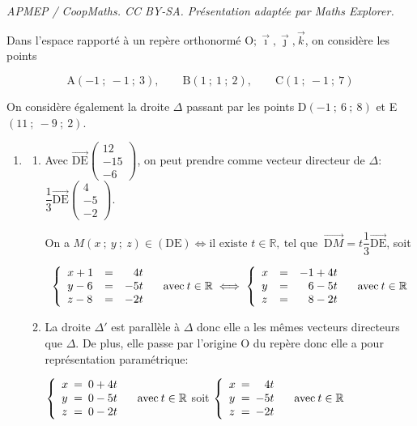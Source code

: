 \documentclass[10pt]{article}
\providecommand{\R}{\mathbb{R}}
\providecommand{\vect}[1]{\overrightarrow{#1}}
\providecommand{\Oijk}{\(\mathrm{O};\vec{\imath},\vec{\jmath},\vec{k}\)}
\begin{document}
\noindent\textit{APMEP / CoopMaths. CC BY-SA. Présentation adaptée par Maths Explorer.}\par\medskip
\medskip

Dans l'espace rapporté à un repère orthonormé \Oijk, on considère les points

\[\text{A}(-1~;~-1~;~3),\qquad \text{B}(1~;~1~;~2),\qquad  \text{C}(1~;~-1~;~7)\]

On considère également la droite $\Delta$ passant par les points D$(-1~;~6~;~8)$ et E$(11~;~- 9~;~2)$.

\medskip

\begin{enumerate}
\item 
	\begin{enumerate}
		\item 
		





Avec $\vect{\text{DE}}\begin{pmatrix}12\\-15\\-6\end{pmatrix}$, on peut prendre comme vecteur directeur de $\Delta$:
$\dfrac13\vect{\text{DE}}\begin{pmatrix}4\\-5\\-2\end{pmatrix}$.

On a  $M(x~;~y~;~z) \in (\text{DE}) \iff \text{il existe } t \in \R, \: \text{tel que } \: \vect{\text{D}M} = t \dfrac13\vect{\text{DE}}$, soit 

\[\left\{\begin{array}{l c r}
x + 1 &=& 4t\\
y - 6 &=&-5t\\
z - 8 &=& -2t
\end{array}\right. \quad\text{avec}\: t \in \R
\iff 
\left\{\begin{array}{l c l}
x &=& -1 + 4t\\
y &=& \phantom{-}6 - 5t \\
z &=& \phantom{-}8 - 2t
\end{array}\right. \quad\text{avec}\: t \in \R\]
		\item La droite $\Delta'$ est parallèle à $\Delta$ donc elle a les mêmes vecteurs directeurs que $\Delta$. De plus, elle passe par l'origine O du repère donc elle a pour représentation paramétrique:

$\left\{\begin{array}{l !{=} r}
x&0+4t\\
y&0-5t\\
z& 0-2t
\end{array}\right. \quad\text{avec}\: t \in \R$
soit
$\left\{\begin{array}{l !{=} r}
x&4t\\
y&-5t\\
z& -2t
\end{array}\right. \quad\text{avec}\: t \in \R$


\end{enumerate}
\end{enumerate}
\end{document}
